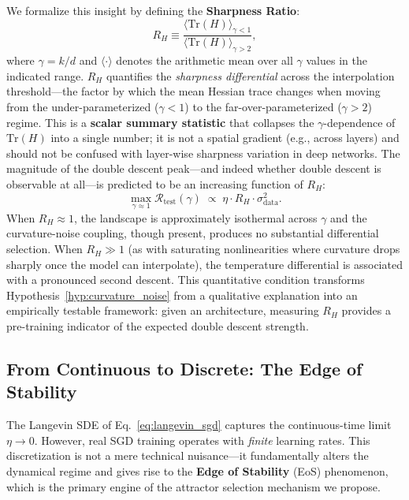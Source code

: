 \documentclass[
  journal=largetwo,
  simfonts=false,
  year=2025,
  volume=37,
]{cup-journal}
\begin{document}
\begin{remark}
We formalize this insight by defining the \textbf{Sharpness Ratio}:
\begin{equation}\label{eq:sharpness_ratio_def}
    R_H \equiv \frac{\langle\mathrm{Tr}(H)\rangle_{\gamma < 1}}{\langle\mathrm{Tr}(H)\rangle_{\gamma > 2}},
\end{equation}
where $\gamma = k/d$ and $\langle\cdot\rangle$ denotes the arithmetic mean over all $\gamma$ values in the indicated range. $R_H$ quantifies the \textit{sharpness differential} across the interpolation threshold---the factor by which the mean Hessian trace changes when moving from the under-parameterized ($\gamma < 1$) to the far-over-parameterized ($\gamma > 2$) regime. This is a \textbf{scalar summary statistic} that collapses the $\gamma$-dependence of $\mathrm{Tr}(H)$ into a single number; it is not a spatial gradient (e.g., across layers) and should not be confused with layer-wise sharpness variation in deep networks. The magnitude of the double descent peak---and indeed whether double descent is observable at all---is predicted to be an increasing function of $R_H$:
\begin{equation}\label{eq:dd_peak_prediction}
    \max_{\gamma \approx 1} \mathcal{R}_{\mathrm{test}}(\gamma) \;\propto\; \eta \cdot R_H \cdot \sigma^2_{\mathrm{data}}.
\end{equation}
When $R_H \approx 1$, the landscape is approximately isothermal across $\gamma$ and the curvature-noise coupling, though present, produces no substantial differential selection. When $R_H \gg 1$ (as with saturating nonlinearities where curvature drops sharply once the model can interpolate), the temperature differential is associated with a pronounced second descent. This quantitative condition transforms Hypothesis~\ref{hyp:curvature_noise} from a qualitative explanation into an empirically testable framework: given an architecture, measuring $R_H$ provides a pre-training indicator of the expected double descent strength.
\end{remark}

\subsection{From Continuous to Discrete: The Edge of Stability}

The Langevin SDE of Eq.~\eqref{eq:langevin_sgd} captures the continuous-time limit $\eta \to 0$. However, real SGD training operates with \textit{finite} learning rates. This discretization is not a mere technical nuisance---it fundamentally alters the dynamical regime and gives rise to the \textbf{Edge of Stability} (EoS) phenomenon, which is the primary engine of the attractor selection mechanism we propose.
\end{document}
